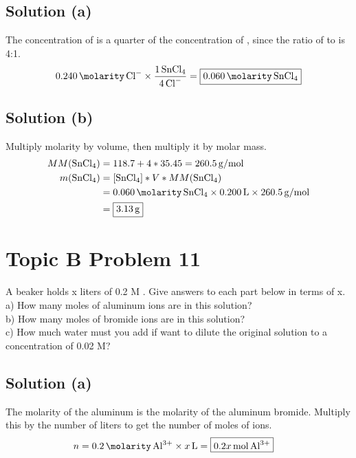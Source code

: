 \documentclass[10pt]{article}
\begin{document}
        \subsection{Solution (a)}
            The concentration of  is a quarter of the concentration of , since the ratio of  to  is 4:1.
            \begin{gather}
                0.240\,\unit{\molarity}\,\ce{Cl-} \times \frac{1\,\ce{SnCl4}}{4\,\ce{Cl-}}
                    =   \boxed{0.060\,\unit{\molarity}\,\ce{SnCl4}}
            \end{gather}

        \subsection{Solution (b)}
            Multiply molarity by volume, then multiply it by molar mass.
            \begin{align}
                MM(\ce{SnCl4})  &=  118.7 + 4 * 35.45
                    =   260.5\,\unit{\gram/\mole}\\
                m(\ce{SnCl4})   &=  \left[ \ce{SnCl4} \right] * V * MM(\ce{SnCl4})\\
                    &=  0.060\,\unit{\molarity}\,\ce{SnCl4} \times  0.200\,\unit{\liter}    \times  260.5\,\unit{\gram/\mole}\\
                    &=  \boxed{3.13\,\unit{\gram}}
            \end{align}

    \pagebreak
    \section{Topic B Problem 11}
        A beaker holds x liters of 0.2 M . 
        Give answers to each part below in terms of x.\\
        a) How many moles of aluminum ions are in this solution?\\
        b) How many moles of bromide ions are in this solution?\\
        c) How much water must you add if want to dilute the original solution to a concentration of 0.02 M?

        \subsection{Solution (a)}
            The molarity of the aluminum is the molarity of the aluminum bromide.
            Multiply this by the number of liters to get the number of moles of ions.
            \begin{align}
                n   &=  0.2\,\unit{\molarity}\,\ce{Al^3+} \times x\,\unit{\liter}
                    =   \boxed{0.2x\,\unit{\mole}\,\ce{Al^3+}}
            \end{align}
            
\end{document}
